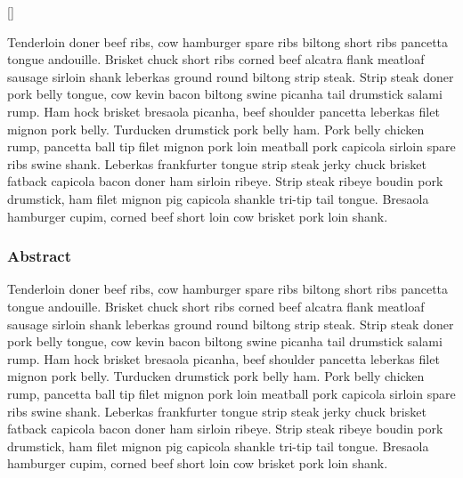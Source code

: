 []

Tenderloin doner beef ribs, cow hamburger spare ribs biltong short ribs pancetta tongue andouille. Brisket chuck short ribs corned beef alcatra flank meatloaf sausage sirloin shank leberkas ground round biltong strip steak. Strip steak doner pork belly tongue, cow kevin bacon biltong swine picanha tail drumstick salami rump. Ham hock brisket bresaola picanha, beef shoulder pancetta leberkas filet mignon pork belly. Turducken drumstick pork belly ham. Pork belly chicken rump, pancetta ball tip filet mignon pork loin meatball pork capicola sirloin spare ribs swine shank. Leberkas frankfurter tongue strip steak jerky chuck brisket fatback capicola bacon doner ham sirloin ribeye. Strip steak ribeye boudin pork drumstick, ham filet mignon pig capicola shankle tri-tip tail tongue. Bresaola hamburger cupim, corned beef short loin cow brisket pork loin shank.


\subsubsection{\Large Abstract}

Tenderloin doner beef ribs, cow hamburger spare ribs biltong short ribs pancetta tongue andouille. Brisket chuck short ribs corned beef alcatra flank meatloaf sausage sirloin shank leberkas ground round biltong strip steak. Strip steak doner pork belly tongue, cow kevin bacon biltong swine picanha tail drumstick salami rump. Ham hock brisket bresaola picanha, beef shoulder pancetta leberkas filet mignon pork belly. Turducken drumstick pork belly ham. Pork belly chicken rump, pancetta ball tip filet mignon pork loin meatball pork capicola sirloin spare ribs swine shank. Leberkas frankfurter tongue strip steak jerky chuck brisket fatback capicola bacon doner ham sirloin ribeye. Strip steak ribeye boudin pork drumstick, ham filet mignon pig capicola shankle tri-tip tail tongue. Bresaola hamburger cupim, corned beef short loin cow brisket pork loin shank.







